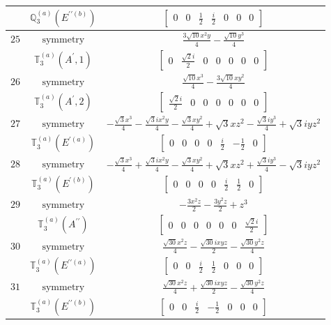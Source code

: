 \documentclass[fleqn,8pt,landscape]{jsarticle}
\begin{document}
\begin{longtable}{ccc}
$  $ & $ \mathbb{Q}_{3}^{(a)}(E^{\prime\prime(b)}) $ & $ \begin{bmatrix} 0 & 0 & \frac{1}{2} & \frac{i}{2} & 0 & 0 & 0 \end{bmatrix} $ \\ \hline
$ 25 $ & $ \text{symmetry} $ & $ \frac{3 \sqrt{10} x^{2} y}{4} - \frac{\sqrt{10} y^{3}}{4} $ \\
$  $ & $ \mathbb{T}_{3}^{(a)}(A^{\prime},1) $ & $ \begin{bmatrix} 0 & \frac{\sqrt{2} i}{2} & 0 & 0 & 0 & 0 & 0 \end{bmatrix} $ \\ \hline
$ 26 $ & $ \text{symmetry} $ & $ \frac{\sqrt{10} x^{3}}{4} - \frac{3 \sqrt{10} x y^{2}}{4} $ \\
$  $ & $ \mathbb{T}_{3}^{(a)}(A^{\prime},2) $ & $ \begin{bmatrix} \frac{\sqrt{2} i}{2} & 0 & 0 & 0 & 0 & 0 & 0 \end{bmatrix} $ \\ \hline
$ 27 $ & $ \text{symmetry} $ & $ - \frac{\sqrt{3} x^{3}}{4} - \frac{\sqrt{3} i x^{2} y}{4} - \frac{\sqrt{3} x y^{2}}{4} + \sqrt{3} x z^{2} - \frac{\sqrt{3} i y^{3}}{4} + \sqrt{3} i y z^{2} $ \\
$  $ & $ \mathbb{T}_{3}^{(a)}(E^{\prime(a)}) $ & $ \begin{bmatrix} 0 & 0 & 0 & 0 & \frac{i}{2} & - \frac{1}{2} & 0 \end{bmatrix} $ \\ \hline
$ 28 $ & $ \text{symmetry} $ & $ - \frac{\sqrt{3} x^{3}}{4} + \frac{\sqrt{3} i x^{2} y}{4} - \frac{\sqrt{3} x y^{2}}{4} + \sqrt{3} x z^{2} + \frac{\sqrt{3} i y^{3}}{4} - \sqrt{3} i y z^{2} $ \\
$  $ & $ \mathbb{T}_{3}^{(a)}(E^{\prime(b)}) $ & $ \begin{bmatrix} 0 & 0 & 0 & 0 & \frac{i}{2} & \frac{1}{2} & 0 \end{bmatrix} $ \\ \hline
$ 29 $ & $ \text{symmetry} $ & $ - \frac{3 x^{2} z}{2} - \frac{3 y^{2} z}{2} + z^{3} $ \\
$  $ & $ \mathbb{T}_{3}^{(a)}(A^{\prime\prime}) $ & $ \begin{bmatrix} 0 & 0 & 0 & 0 & 0 & 0 & \frac{\sqrt{2} i}{2} \end{bmatrix} $ \\ \hline
$ 30 $ & $ \text{symmetry} $ & $ \frac{\sqrt{30} x^{2} z}{4} - \frac{\sqrt{30} i x y z}{2} - \frac{\sqrt{30} y^{2} z}{4} $ \\
$  $ & $ \mathbb{T}_{3}^{(a)}(E^{\prime\prime(a)}) $ & $ \begin{bmatrix} 0 & 0 & \frac{i}{2} & \frac{1}{2} & 0 & 0 & 0 \end{bmatrix} $ \\ \hline
$ 31 $ & $ \text{symmetry} $ & $ \frac{\sqrt{30} x^{2} z}{4} + \frac{\sqrt{30} i x y z}{2} - \frac{\sqrt{30} y^{2} z}{4} $ \\
$  $ & $ \mathbb{T}_{3}^{(a)}(E^{\prime\prime(b)}) $ & $ \begin{bmatrix} 0 & 0 & \frac{i}{2} & - \frac{1}{2} & 0 & 0 & 0 \end{bmatrix} $ \\ \hline
\end{longtable}
\end{document}
